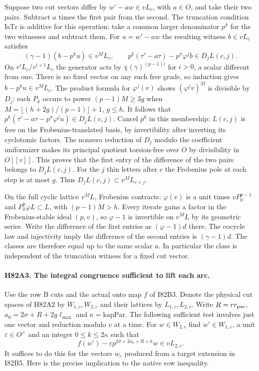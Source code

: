Suppose two cut vectors differ by $w'-a w\in vL_c$, with $a\in O$,
and take their two pairs. Subtract $a$ times the first pair from
the second. The truncation condition $\mathrm{IsTr}$ is additive
for this operation: take a common larger denominator $p^k$ for
the two witnesses and subtract them. For $u=w'-a w$ the resulting
witness $b\in vL_c$ satisfies
\[
 (\gamma-1)(b-p^ku)\in v^ML_c,\qquad
 p^k(\tau'-a\tau)-p^\sigma\varphi^j b\in D_j L(c,j).
\]
On $v^i L_c/v^{i+1}L_c$ the generator acts by
$\chi(\gamma)^{(p-1)i}$ for $i>0$, a scalar different from one.
There is no fixed vector on any such free grade, so induction
gives $b-p^ku\in v^M L_c$. The product formula for $\varphi^j(v)$
shows $(\varphi^j v)^M$ is divisible by $D_j$:
each $P_k$ occurs to power $(p-1)M\ge3g$ when
$M=\lfloor(h+2g)/(p-1)\rfloor+1$, $g\le h$.
It follows that $p^k(\tau'-a\tau-p^\sigma\varphi^ju)\in D_jL(c,j)$.
Cancel $p^k$ in this membership: $L(c,j)$ is free on the
Frobenius-translated basis, by invertibility after inverting its
cyclotomic factors. The nonzero reduction of $D_j$ modulo the
coefficient uniformizer makes its principal quotient torsion-free
over $O$ by divisibility in $O[[v]]$. This proves that the first
entry of the difference of the two pairs belongs to $D_jL(c,j)$.
For the $j$ thin letters after $c$ the Frobenius pole at each
step is at most $g$. Thus $D_jL(c,j)\subset v^ML_{c+j}$.

On the full cyclic lattice $v^M L$, Frobenius contracts:
$\varphi(v)$ is a unit times $vP_0^{p-1}$ and
$P_0^h\varphi L\subset L$, with $(p-1)M>h$.
Every iterate gains a factor in the Frobenius-stable ideal $(p,v)$,
so $\varphi-1$ is invertible on $v^M L$ by its geometric series.
Write the difference of the first entries as $(\varphi-1)d$
there. The cocycle law and injectivity imply the difference of
the second entries is $(\gamma-1)d$. The classes are therefore
equal up to the same scalar $a$. In particular the class is
independent of the truncation witness for a fixed cut vector.

\paragraph{H82A3. The integral congruence sufficient to lift each arc.}
Use the row B cuts and the actual onto map $f$ of I82B3. Denote
the physical cut spaces of H82A2 by $W_{1,c},W_{2,c}$ and their
lattices by $L_{1,c},L_{2,c}$. Write $R=rr_{\rm par}$,
$a_0=2\sigma+R+2g\ell_{\max}$ and $\kappa=\mathrm{kapPar}$.
The following sufficient test involves just one vector and reduction
modulo $v$ at a time. For $w\in W_{2,c}$ find
$w'\in W_{1,c}$, a unit $\varepsilon\in O^\times$ and an integer
$0\le k\le2\kappa$ such that
\[
 f(w')-\varepsilon p^{2\sigma+2a_0+R+k}w\in vL_{2,c}.
\]
It suffices to do this for the vectors $w_c$ produced from a target
extension in I82B5. Here is the precise implication to the native
row inequality.

